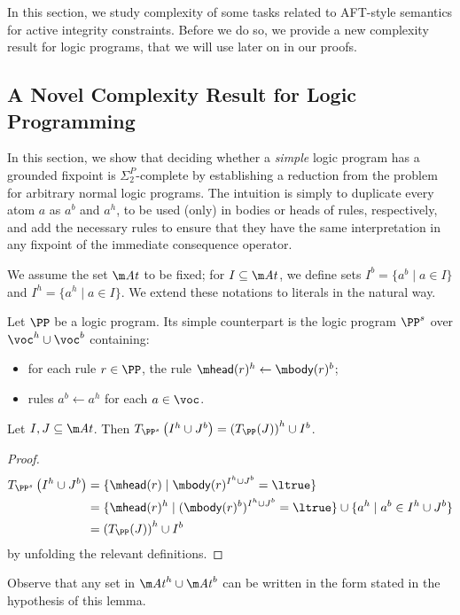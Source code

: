 
In this section, we study complexity of some tasks related to AFT-style semantics for active integrity constraints. 
Before we do so, we provide a new complexity result for logic programs, that we will use later on in our proofs. 

\subsection{A Novel Complexity Result for Logic Programming} 

In this section, we show that deciding whether a \emph{simple} logic program has a grounded fixpoint is $\Sigma^P_2$-complete by establishing a reduction from the problem for arbitrary normal logic programs. 
The intuition is simply to duplicate every atom $a$ as $a^b$ and $a^h$, to be used (only) in bodies or heads of rules, respectively, and add the necessary rules to ensure that they have the same interpretation in any fixpoint of the immediate consequence operator.

We assume the set $\atoms$ to be fixed; for $I\subseteq\atoms$, we define sets $I^b=\{a^b\mid a\in I\}$ and $I^h=\{a^h\mid a\in I\}$.
We extend these notations to literals in the natural way.

\begin{definition}
  Let $\PP$ be a logic program.
  Its simple counterpart is the logic program $\PP^s$ over $\voc^h\cup\voc^b$ containing:
  \begin{itemize}
  \item for each rule $r\in\PP$, the rule $\head(r)^h\leftarrow\body(r)^b$;
  \item rules $a^b\leftarrow a^h$ for each $a\in\voc$.
  \end{itemize}
\end{definition}

\begin{lemma}
  \label{lem:op-simple}
  Let $I,J\subseteq\atoms$.
  Then $T_{\PP^s}\left(I^h\cup J^b\right) = \left(T_\PP(J)\right)^h\cup I^b$.
\end{lemma}
\begin{proof}
  \begin{align*}
    T_{\PP^s}\left(I^h\cup J^b\right) &= \{\head(r)\mid\body(r)^{I^h\cup J^b}=\ltrue\} \\
    &= \{\head(r)^h\mid(\body(r)^b)^{I^h\cup J^b}=\ltrue\}\cup\{a^h\mid a^b\in I^h\cup J^b\} \\
    &= \left(T_\PP(J)\right)^h\cup I^b
  \end{align*}
  by unfolding the relevant definitions.
\end{proof}
Observe that any set in $\atoms^h\cup\atoms^b$ can be written in the form stated in the hypothesis of this lemma.


